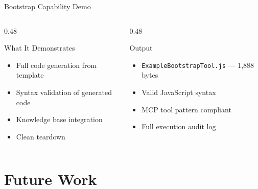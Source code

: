 \documentclass[aspectratio=169]{beamer}
\begin{document}
\begin{frame}{Bootstrap Capability Demo}
\vspace{0.5em}
\begin{columns}[T]
\begin{column}{0.48\textwidth}
\begin{block}{What It Demonstrates}
\begin{itemize}
    \item Full code generation from template
    \item Syntax validation of generated code
    \item Knowledge base integration
    \item Clean teardown
\end{itemize}
\end{block}
\end{column}
\begin{column}{0.48\textwidth}
\begin{block}{Output}
\begin{itemize}
    \item \texttt{ExampleBootstrapTool.js} — 1,888 bytes
    \item Valid JavaScript syntax
    \item MCP tool pattern compliant
    \item Full execution audit log
\end{itemize}
\end{block}
\end{column}
\end{columns}
\end{frame}

\section{Future Work}
\end{document}
